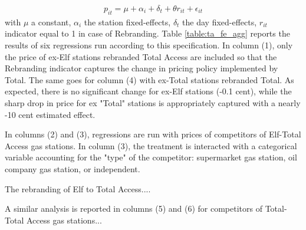 \documentclass[11pt]{article}
\begin{document}
\begin{align*}
p_{it} = \mu + \alpha_i + \delta_t + \theta r_{it} + \epsilon_{it}
\end{align*}
with $\mu$ a constant, $\alpha_i$ the station fixed-effects, $\delta_t$ the day fixed-effects, $r_{it}$ indicator equal to 1 in case of Rebranding. Table \ref{table:ta_fe_agg} reports the results of six regressions run according to this specification. In column (1), only the price of ex-Elf stations rebranded Total Access are included so that the Rebranding indicator captures the change in pricing policy implemented by Total. The same goes for column (4) with ex-Total stations rebranded Total. As expected, there is no significant change for ex-Elf stations (-0.1 cent), while the sharp drop in price for ex "Total" stations is appropriately captured with a nearly -10 cent estimated effect.

In columns (2) and (3), regressions are run with prices of competitors of Elf-Total Access gas stations. In column (3), the treatment is interacted with a categorical variable accounting for the "type" of the competitor: supermarket gas station, oil company gas station, or independent.

 The rebranding of Elf to Total Access....

 A similar analysis is reported in columns (5) and (6) for competitors of Total-Total Access gas stations...
\end{document}

